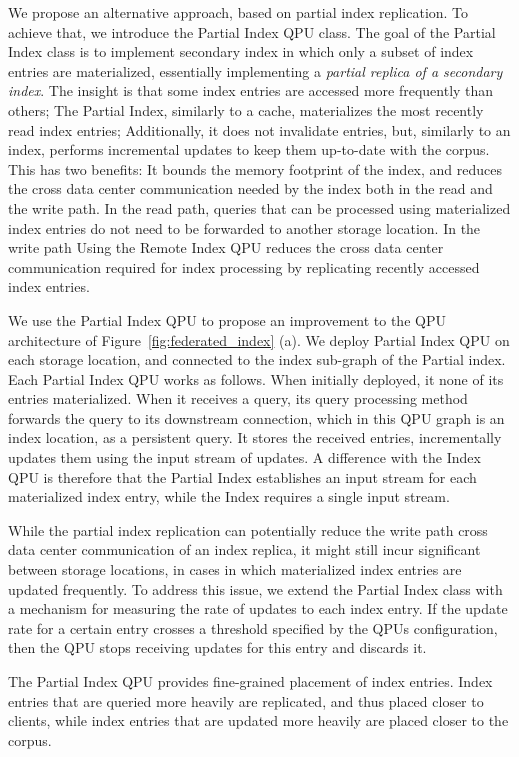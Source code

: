 We propose an alternative approach, based on partial index replication.
To achieve that, we introduce the Partial Index QPU class.
The goal of the Partial Index class is to implement secondary index in which only a subset of index entries are materialized,
essentially implementing a \textit{partial replica of a secondary index}.
The insight is that some index entries are accessed more frequently than others;
The Partial Index, similarly to a cache, materializes the most recently read index entries;
Additionally, it does not invalidate entries, but, similarly to an index, performs incremental updates to keep them up-to-date
with the corpus.
This has two benefits:
It bounds the memory footprint of the index, and reduces the cross data center communication needed by the index both in the read and the write path.
In the read path, queries that can be processed using materialized index entries do not need to be forwarded to
another storage location.
In the write path
Using the Remote Index QPU reduces the cross data center communication required for index processing by
replicating recently accessed index entries.

We use the Partial Index QPU to propose an improvement to the QPU architecture of Figure~\ref{fig:federated_index} (a).
We deploy Partial Index QPU on each storage location, and connected to the index sub-graph of the Partial index.
Each Partial Index QPU works as follows.
When initially deployed, it none of its entries materialized.
When it receives a query, its query processing method forwards the query to its downstream connection,
which in this QPU graph is an index location, as a persistent query.
It stores the received entries, incrementally updates them using the input stream of updates.
A difference with the Index QPU is therefore that the Partial Index establishes an input stream for each materialized
index entry, while the Index requires a single input stream.

While the partial index replication can potentially reduce the write path cross data center communication of an index replica,
it might still incur significant between storage locations,
in cases in which materialized index entries are updated frequently.
To address this issue,
we extend the Partial Index class with a mechanism for measuring the rate of updates to each index entry.
If the update rate for a certain entry crosses a threshold specified by the QPUs configuration,
then the QPU stops receiving updates for this entry and discards it.

The Partial Index QPU provides fine-grained placement of index entries.
Index entries that are queried more heavily are replicated, and thus placed closer to clients,
while index entries that are updated more heavily are placed closer to the corpus.

